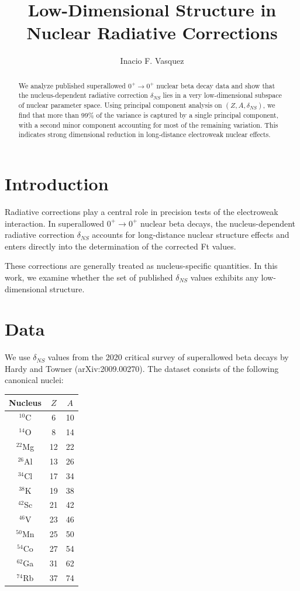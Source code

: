 \documentclass[11pt]{article}
\title{Low-Dimensional Structure in Nuclear Radiative Corrections}
\author{Inacio F. Vasquez}
\date{}
\begin{document}
\maketitle

\begin{abstract}
We analyze published superallowed $0^+ \to 0^+$ nuclear beta decay data
and show that the nucleus-dependent radiative correction $\delta_{NS}$
lies in a very low-dimensional subspace of nuclear parameter space.
Using principal component analysis on $(Z, A, \delta_{NS})$, we find
that more than 99\% of the variance is captured by a single principal
component, with a second minor component accounting for most of the
remaining variation. This indicates strong dimensional reduction in
long-distance electroweak nuclear effects.
\end{abstract}

\section{Introduction}
Radiative corrections play a central role in precision tests of the
electroweak interaction. In superallowed $0^+ \to 0^+$ nuclear beta
decays, the nucleus-dependent radiative correction $\delta_{NS}$
accounts for long-distance nuclear structure effects and enters
directly into the determination of the corrected Ft values.

These corrections are generally treated as nucleus-specific quantities.
In this work, we examine whether the set of published $\delta_{NS}$
values exhibits any low-dimensional structure.

\section{Data}
We use $\delta_{NS}$ values from the 2020 critical survey of superallowed
beta decays by Hardy and Towner (arXiv:2009.00270). The dataset consists
of the following canonical nuclei:

\begin{center}
\begin{tabular}{ccc}
\toprule
Nucleus & $Z$ & $A$ \\
\midrule
$^{10}$C & 6 & 10 \\
$^{14}$O & 8 & 14 \\
$^{22}$Mg & 12 & 22 \\
$^{26}$Al & 13 & 26 \\
$^{34}$Cl & 17 & 34 \\
$^{38}$K & 19 & 38 \\
$^{42}$Sc & 21 & 42 \\
$^{46}$V & 23 & 46 \\
$^{50}$Mn & 25 & 50 \\
$^{54}$Co & 27 & 54 \\
$^{62}$Ga & 31 & 62 \\
$^{74}$Rb & 37 & 74 \\
\bottomrule
\end{tabular}
\end{center}
\end{document}
